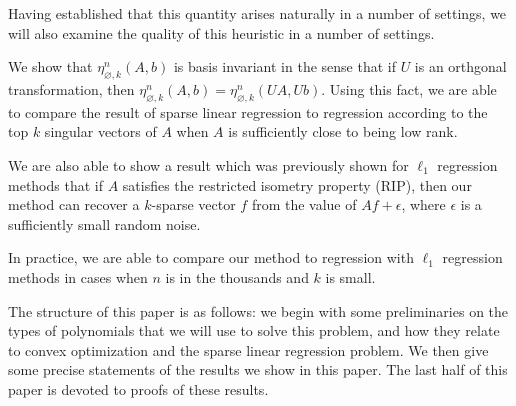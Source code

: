 Having established that this quantity arises naturally in a number of settings, we will also examine the quality of this heuristic in a number of settings.

We show that $\eta_{\varnothing, k}^n(A,b)$ is basis invariant in the sense that if $U$ is an orthgonal transformation, then $\eta_{\varnothing, k}^n(A,b) = \eta_{\varnothing, k}^n(UA,Ub)$.
Using this fact, we are able to compare the result of sparse linear regression to regression according to the top $k$ singular vectors of $A$ when $A$ is sufficiently close to being low rank.

We are also able to show a result which was previously shown for $\ell_1$ regression methods that if $A$ satisfies the restricted isometry property (RIP), then our method can recover a $k$-sparse vector $f$ from the value of $Af+\epsilon$, where $\epsilon$ is a sufficiently small random noise.

In practice, we are able to compare our method to regression with $\ell_1$ regression methods in cases when $n$ is in the thousands and $k$ is small. %

The structure of this paper is as follows: we begin with some preliminaries on the types of polynomials that we will use to solve this problem, and how they relate to convex optimization and the sparse linear regression problem.
We then give some precise statements of the results we show in this paper.
The last half of this paper is devoted to proofs of these results.
